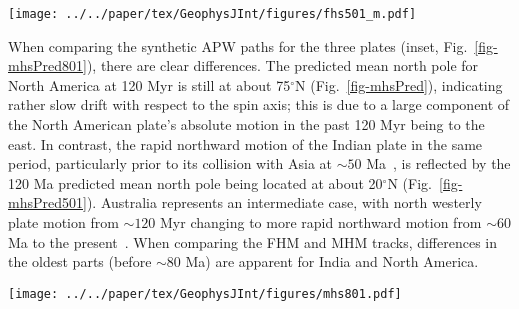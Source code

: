 \begin{figure*}
\centering
\texttt{[image: ../../paper/tex/GeophysJInt/figures/fhs501\_m.pdf]}
\caption[120 Ma MHM vs FHS predicted APWP of India]{MHM predicted
120 Ma APWP (solid line) for India through the
India\textendash{}Somalia\textendash{}Nubia\textendash{}Mantle plate circuit.
Its age step is 5 Myr. The dashed line is the FHM predicted path shown for
comparison. The inset shows paths for fast moving India and also much slower
moving North America shown in Fig.~\ref{fig-mhsPred}.}\label{fig-mhsPred501}
\end{figure*}

When comparing the synthetic APW paths for the three plates (inset,
Fig.~\ref{fig-mhsPred801}), there are clear differences. The predicted mean
north pole for North America at 120 Myr is still at about 75$^{\circ}$N
(Fig.~\ref{fig-mhsPred}), indicating rather slow drift with respect to the spin
axis; this is due to a large component of the North American plate's absolute
motion in the past 120 Myr being to the east. In contrast, the rapid northward
motion of the Indian plate in the same period, particularly prior to its
collision with Asia at ${\sim}50$ Ma~\citep{N10}, is reflected by
the 120 Ma predicted mean north pole being located at about 20$^{\circ}$N
(Fig.~\ref{fig-mhsPred501}). Australia represents an intermediate case, with
north westerly plate motion from ${\sim}120$ Myr changing to more
rapid northward motion from ${\sim}60$ Ma to the present~\citep{W07}.
When comparing the FHM and MHM tracks, differences in the oldest parts (before
${\sim}80$ Ma) are apparent for India and North America.

\begin{figure*}
\centering
\texttt{[image: ../../paper/tex/GeophysJInt/figures/mhs801.pdf]}
\caption[120 Ma MHM vs FHM predicted APWP of Australia]{MHM
predicted 120 Ma APWP (solid line) for Australia through the
Australia\textendash{}East
Antarctica\textendash{}Somalia\textendash{}Nubia\textendash{}Mantle plate
circuit. Its age step is 5 Myr. The dashed line is the FHM predicted path shown
for comparison. The inset shows paths for fast moving India shown in
Fig.~\ref{fig-mhsPred501}, much slower moving North America shown in
Fig.~\ref{fig-mhsPred}, and also relatively intermediate moving
Australia.}\label{fig-mhsPred801}
\end{figure*}

